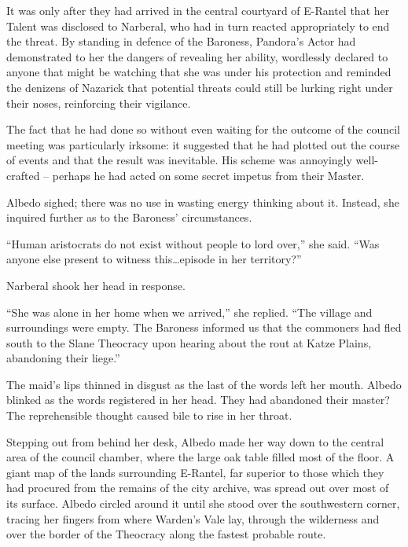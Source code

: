  

It was only after they had arrived in the central courtyard of E-Rantel that her Talent was disclosed to Narberal, who had in turn reacted appropriately to end the threat. By standing in defence of the Baroness, Pandora’s Actor had demonstrated to her the dangers of revealing her ability, wordlessly declared to anyone that might be watching that she was under his protection and reminded the denizens of Nazarick that potential threats could still be lurking right under their noses, reinforcing their vigilance.

 

The fact that he had done so without even waiting for the outcome of the council meeting was particularly irksome: it suggested that he had plotted out the course of events and that the result was inevitable. His scheme was annoyingly well-crafted – perhaps he had acted on some secret impetus from their Master.

 

Albedo sighed; there was no use in wasting energy thinking about it. Instead, she inquired further as to the Baroness’ circumstances.

 

“Human aristocrats do not exist without people to lord over,” she said. “Was anyone else present to witness this…episode in her territory?”

 

Narberal shook her head in response.

 

“She was alone in her home when we arrived,” she replied. “The village and surroundings were empty. The Baroness informed us that the commoners had fled south to the Slane Theocracy upon hearing about the rout at Katze Plains, abandoning their liege.”

 

The maid’s lips thinned in disgust as the last of the words left her mouth. Albedo blinked as the words registered in her head. They had abandoned their master? The reprehensible thought caused bile to rise in her throat.

 

Stepping out from behind her desk, Albedo made her way down to the central area of the council chamber, where the large oak table filled most of the floor. A giant map of the lands surrounding E-Rantel, far superior to those which they had procured from the remains of the city archive, was spread out over most of its surface. Albedo circled around it until she stood over the southwestern corner, tracing her fingers from where Warden’s Vale lay, through the wilderness and over the border of the Theocracy along the fastest probable route.

